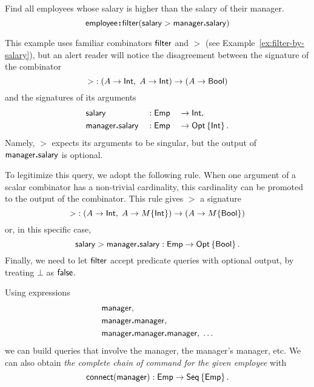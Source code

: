 \begin{example}
    \label{ex:employee-filter-salary-manager}
    Find all employees whose salary is higher than the salary of their manager.
    \begin{equation*}
        \textup{\textsf{employee}}\!\boldsymbol{:}\!\textup{\textsf{filter}}(\textup{\textsf{salary}}>\textup{\textsf{manager}}\boldsymbol{.}\textup{\textsf{salary}})
    \end{equation*}
\end{example}

This example uses familiar combinators $\textup{\textsf{filter}}$ and ${>}$ (see
Example~\ref{ex:filter-by-salary}), but an alert reader will notice the
disagreement between the signature of the combinator
\begin{equation*}
    {>} : (A \to \textup{\textsf{Int}},\; A \to \textup{\textsf{Int}}) \to (A \to \textup{\textsf{Bool}})
\end{equation*}
and the signatures of its arguments
\begin{alignat*}{3}
    & \textup{\textsf{salary}} && : \textup{\textsf{Emp}} && \to \textup{\textsf{Int}}, \\
    & \textup{\textsf{manager}}\boldsymbol{.}\textup{\textsf{salary}} && : \textup{\textsf{Emp}} && \to \textup{\textsf{Opt}}\left\{\textup{\textsf{Int}}\right\}.
\end{alignat*}
Namely, ${>}$ expects its arguments to be singular, but the output of
$\textup{\textsf{manager}}\boldsymbol{.}\textup{\textsf{salary}}$ is optional.

To legitimize this query, we adopt the following rule.  When one argument of a
scalar combinator has a non-trivial cardinality, this cardinality can be
promoted to the output of the combinator.  This rule gives ${>}$ a signature
\begin{equation*}
    {>} : (A \to \textup{\textsf{Int}},\; A \to M\{\textup{\textsf{Int}}\}) \to (A \to M\{\textup{\textsf{Bool}}\})
\end{equation*}
or, in this specific case,
\begin{equation*}
    \textup{\textsf{salary}} > \textup{\textsf{manager}}\boldsymbol{.}\textup{\textsf{salary}} : \textup{\textsf{Emp}} \to \textup{\textsf{Opt}}\left\{\textup{\textsf{Bool}}\right\}.
\end{equation*}
Finally, we need to let $\textup{\textsf{filter}}$ accept predicate queries with optional
output, by treating $\bot$ as $\textup{\textsf{false}}$.

Using expressions
\begin{align*}
    & \textup{\textsf{manager}}, \\
    & \textup{\textsf{manager}}\boldsymbol{.}\textup{\textsf{manager}}, \\
    & \textup{\textsf{manager}}\boldsymbol{.}\textup{\textsf{manager}}\boldsymbol{.}\textup{\textsf{manager}},\; \ldots
\end{align*}
we can build queries that involve the manager, the manager's manager, etc.  We
can also obtain \emph{the complete chain of command for the given employee}
with
\begin{equation*}
    \textup{\textsf{connect}}(\textup{\textsf{manager}}) : \textup{\textsf{Emp}} \to \textup{\textsf{Seq}}\left\{\textup{\textsf{Emp}}\right\}.
\end{equation*}

